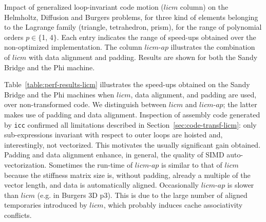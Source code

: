 \documentclass[conference]{IEEEtran}
\begin{document}
\begin{table}[t]\normalsize
\massmatrixtwodresultsnorms
\label{table:perf-results-licm}
\caption{Impact of generalized loop-invariant code motion ($licm$ column) on the Helmholtz, Diffusion and Burgers problems, for three kind of elements belonging to the Lagrange family (triangle, tetrahedron, prism), for the range of polynomial orders $p \in \lbrace$1, 4$\rbrace$. Each entry indicates the range of speed-ups obtained over the non-optimized implementation. The column $licm$-$ap$ illustrates the combination of $licm$ with data alignment and padding. Results are shown for both the Sandy Bridge and the Phi machine.}
\end{table}

Table~\ref{table:perf-results-licm} illustrates the speed-ups obtained on the Sandy Bridge and the Phi machines when $licm$, data alignment, and padding are used, over non-transformed code. We distinguish between $licm$ and $licm$-$ap$; the latter makes use of padding and data alignment. Inspection of assembly code generated by \texttt{icc} confirmed all limitations described in Section~\ref{sec:code-transf-licm}: only sub-expressions invariant with respect to outer loops are hoisted and, interestingly, not vectorized. This motivates the usually significant gain obtained. Padding and data alignment enhance, in general, the quality of SIMD auto-vectorization. Sometimes the run-time of $licm$-$ap$ is similar to that of $licm$ because the stiffness matrix size is, without padding, already a multiple of the vector length, and data is automatically aligned. Occasionally $licm$-$ap$ is slower than $licm$ (e.g. in Burgers 3D p3). This is due to the large number of aligned temporaries introduced by $licm$, which probably induces cache associativity conflicts. 
\end{document}
